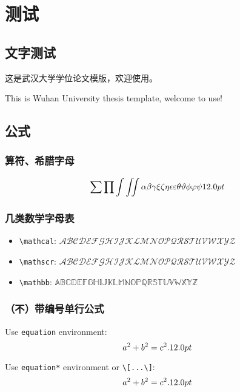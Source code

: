 \chapter{测试\the\baselineskip}
\the\baselineskip
\section{文字测试\the\baselineskip}

这是武汉大学学位论文模版，欢迎使用。\the\baselineskip

This is Wuhan University thesis template, welcome to use!\the\baselineskip

\section{公式\the\baselineskip}

\subsection{算符、希腊字母\the\baselineskip}

\[\sum\prod\int\iint\alpha\beta\gamma\xi\zeta\eta\epsilon\varepsilon\theta\vartheta
    \phi\varphi\psi \the\baselineskip\]

\subsection{几类数学字母表\the\baselineskip}

\begin{itemize}
    \item \verb|\mathcal|: $\mathcal{ABCDEFGHIJKLMNOPQRSTUVWXYZ}$ \the\baselineskip
    \item \verb|\mathscr|: $\mathscr{ABCDEFGHIJKLMNOPQRSTUVWXYZ}$ \the\baselineskip
    \item \verb|\mathbb|: $\mathbb{ABCDEFGHIJKLMNOPQRSTUVWXYZ}$ \the\baselineskip
\end{itemize}

\subsection{（不）带编号单行公式 \the\baselineskip}

Use \texttt{equation} environment: \the\baselineskip
\begin{equation}
    a^2 + b^2 = c^2. \the\baselineskip
\end{equation}
\the\baselineskip

Use \texttt{equation*} environment or \texttt{\textbackslash[...\textbackslash]}: \the\baselineskip
\[ a^2 + b^2 = c^2. \the\baselineskip\]
\the\baselineskip
